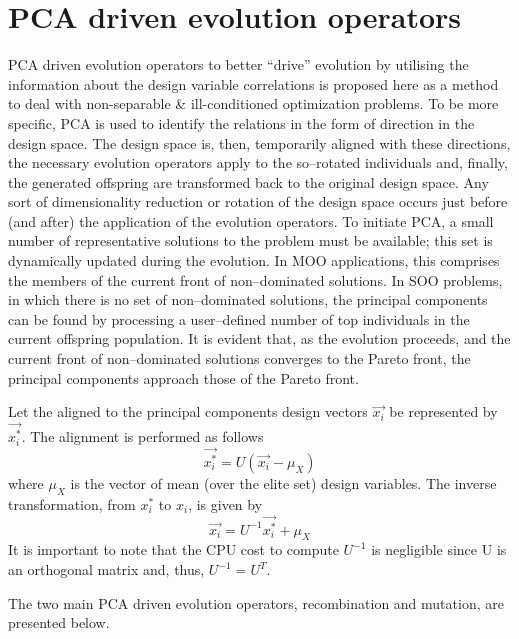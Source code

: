 \section{PCA driven evolution operators} 
PCA driven evolution operators to better ``drive'' evolution by utilising the information about the design variable correlations is proposed here as a method to deal with non-separable \& ill-conditioned optimization problems. To be more specific, PCA is used to identify the relations in the form of direction in the design space. The design space is, then, temporarily aligned with these directions, the necessary evolution operators apply to the so--rotated individuals and, finally, the generated offspring are transformed back to the original design space. Any sort of dimensionality reduction or rotation of the design space occurs just before (and after) the application of the evolution operators. To initiate PCA, a small number of representative solutions to the problem must be available; this set is dynamically updated during the evolution. In MOO applications, this comprises the members of the current front of non--dominated solutions. In SOO problems, in which there is no set of non--dominated solutions, the principal components can be found by processing a user--defined number of top individuals in the current offspring population. It is evident that, as the evolution proceeds, and the current front of non--dominated solutions converges to the Pareto front, the principal components approach those of the Pareto front. 

Let the aligned to the principal components design vectors \(\overrightarrow{x_i}\) be represented by \(\overrightarrow{x^*_i}\). The alignment is performed as follows
\begin{equation} 
   \overrightarrow{x^*_i}=U(\overrightarrow{x_i}-\mu_{X})
   \label{align} %
\end{equation}
where $\mu_{X}$ is the vector of mean (over the elite set) design variables.
The inverse transformation, from $x^*_i$ to $x_i$, is given by
\begin{equation} 
   \overrightarrow{x_i}=U^{-1}\overrightarrow{x^*_i}+\mu_{X}
	\label{re-align}
\end{equation}
It is important to note that the CPU cost to compute \(U^{-1}\) is negligible since U is an orthogonal matrix and, thus, \(U^{-1} = U^T\). 

The two main PCA driven evolution operators, recombination and mutation, are presented below.  

